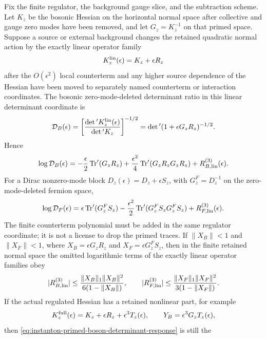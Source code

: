 \begin{controlledapproximation}
\label{ca:instanton-primed-determinant-source-response}
Fix the finite regulator, the background gauge slice, and the subtraction
scheme.  Let \(K_z\) be the bosonic Hessian on the horizontal normal space
after collective and gauge zero modes have been removed, and let
\(G_z=K_z^{-1}\) on that primed space.  Suppose a source or external
background changes the retained quadratic normal action by the exactly linear
operator family
\[
  K_z^{\rm lin}(\epsilon)=K_z+\epsilon R_z
\]
after the \(O(\epsilon^2)\) local counterterm and any higher source dependence
of the Hessian have been moved to separately named counterterm or interaction
coordinates.  The bosonic zero-mode-deleted determinant ratio in this linear
determinant coordinate is
\[
  \mathcal D_B(\epsilon)
  =
  \left[
    \frac{\det{}'K_z^{\rm lin}(\epsilon)}{\det{}'K_z}
  \right]^{-1/2}
  =
  \det{}'(1+\epsilon G_zR_z)^{-1/2}.
\]
Hence
\begin{equation}
  \log \mathcal D_B(\epsilon)
  =
  -\frac{\epsilon}{2}\operatorname{Tr}'(G_zR_z)
  +
  \frac{\epsilon^2}{4}
  \operatorname{Tr}'(G_zR_zG_zR_z)
  +R_{B,{\rm lin}}^{(3)}(\epsilon).
  \label{eq:instanton-primed-boson-determinant-response}
\end{equation}
For a Dirac nonzero-mode block \(D_z(\epsilon)=D_z+\epsilon S_z\), with
\(G_z^{F}=D_z^{-1}\) on the zero-mode-deleted fermion space,
\begin{equation}
  \log \mathcal D_F(\epsilon)
  =
  \epsilon\operatorname{Tr}'(G_z^{F}S_z)
  -
  \frac{\epsilon^2}{2}
  \operatorname{Tr}'(G_z^{F}S_zG_z^{F}S_z)
  +R_{F,{\rm lin}}^{(3)}(\epsilon).
  \label{eq:instanton-primed-fermion-determinant-response}
\end{equation}
The finite counterterm polynomial must be added in the same regulator
coordinate; it is not a license to drop the primed traces.  If
\(\|X_B\|<1\) and \(\|X_F\|<1\), where
\(X_B=\epsilon G_zR_z\) and \(X_F=\epsilon G_z^{F}S_z\), then in the finite
retained normal space the omitted logarithmic terms of the exactly linear
operator families obey
\[
  |R_{B,{\rm lin}}^{(3)}|
  \le
  \frac{\|X_B\|_1\|X_B\|^2}{6(1-\|X_B\|)},
  \qquad
  |R_{F,{\rm lin}}^{(3)}|
  \le
  \frac{\|X_F\|_1\|X_F\|^2}{3(1-\|X_F\|)} .
\]
If the actual regulated Hessian has a retained nonlinear part, for example
\[
  K_z^{\rm full}(\epsilon)
  =
  K_z+\epsilon R_z+\epsilon^3T_z(\epsilon),
  \qquad
  Y_B=\epsilon^3G_zT_z(\epsilon),
\]
then \eqref{eq:instanton-primed-boson-determinant-response} is still the

\end{controlledapproximation}
